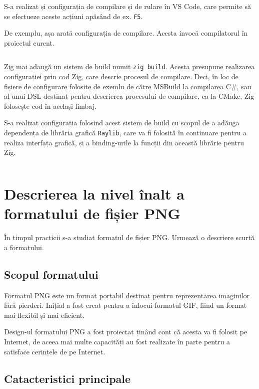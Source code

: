\documentclass[a4paper,12pt]{report}
\begin{document}
S-a realizat și configurația de compilare și de rulare în VS Code,
care permite să se efectueze aceste acțiuni apăsând de ex. \texttt{F5}.

De exemplu, așa arată configurația de compilare.
Acesta invocă compilatorul în proiectul curent.

\inputminted{json}{../.vscode/tasks.json}

Zig mai adaugă un sistem de build numit \texttt{zig build}.
Acesta presupune realizarea configurației prin cod Zig, care descrie procesul de compilare.
Deci, în loc de fișiere de configurare folosite de exemlu de către MSBuild la compilarea C\#,
sau al unui \ac{DSL} destinat pentru descrierea procesului de compilare, ca la CMake,
Zig folosește cod în același limbaj.

S-a realizat configurația folosind acest sistem de build cu scopul de a adăuga dependența
de librăria grafică \texttt{Raylib}\cite{raylib}, care va fi folosită în continuare pentru a realiza
interfața grafică, și a binding-urile la funcții din această librărie pentru Zig.

\inputminted{zig}{../build.zig}


\section{Descrierea la nivel înalt a formatului de fișier PNG}

În timpul practicii s-a studiat formatul de fișier PNG.
Urmează o descriere scurtă a formatului.

\subsection{Scopul formatului}

Formatul PNG este un format portabil destinat pentru reprezentarea imaginilor fără pierderi.
Inițial a fost creat pentru a înlocui formatul GIF, fiind un format mai flexibil și mai eficient.

Design-ul formatului PNG a fost proiectat ținând cont că acesta va fi folosit pe Internet,
de aceea mai multe capacități au fost realizate în parte
pentru a satisface cerințele de pe Internet.

\subsection{Catacteristici principale}
\end{document}
